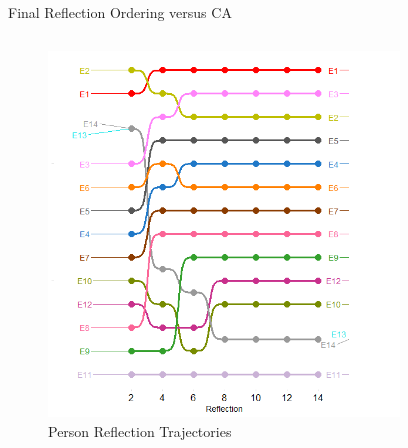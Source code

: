 \documentclass[
  ignorenonframetext,
]{beamer}
\begin{document}
\begin{frame}{Final Reflection Ordering versus CA}
\protect\hypertarget{final-reflection-ordering-versus-ca-1}{}
\begin{columns}[T]
\begin{column}{0.5\textwidth}
\begin{figure}

{\centering \includegraphics{Plots/g-reflections-sw.png}

}

\caption{Person Reflection Trajectories}

\end{figure}
\end{column}

\begin{column}{0.5\textwidth}
\begin{figure}


\end{figure}
\end{column}
\end{columns}
\end{frame}
\end{document}
